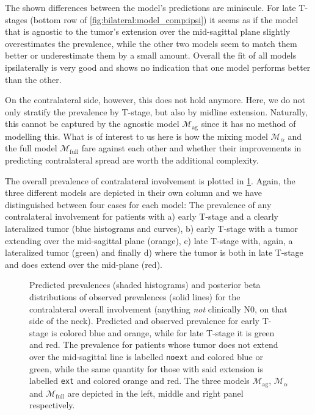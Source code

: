 \documentclass[\relativeRoot/main.tex]{subfiles}
\begin{document}
The shown differences between the model's predictions are miniscule. For late T-stages (bottom row of \cref{fig:bilateral:model_comp:ipsi}) it seems as if the model that is agnostic to the tumor's extension over the mid-sagittal plane slightly overestimates the prevalence, while the other two models seem to match them better or underestimate them by a small amount. Overall the fit of all models ipsilaterally is very good and shows no indication that one model performs better than the other.

On the contralateral side, however, this does not hold anymore. Here, we do not only stratify the prevalence by T-stage, but also by midline extension. Naturally, this cannot be captured by the agnostic model $\mathcal{M}_\text{ag}$ since it has no method of modelling this. What is of interest to us here is how the mixing model $\mathcal{M}_\alpha$ and the full model $\mathcal{M}_\text{full}$ fare against each other and whether their improvements in predicting contralateral spread are worth the additional complexity.

The overall prevalence of contralateral involvement is plotted in \cref{fig:bilateral:model_comp:contra}. Again, the three different models are depicted in their own column and we have distinguished between four cases for each model: The prevalence of any contralateral involvement for patients with a) early T-stage and a clearly lateralized tumor (blue histograms and curves), b) early T-stage with a tumor extending over the mid-sagittal plane (orange), c) late T-stage with, again, a lateralized tumor (green) and finally d) where the tumor is both in late T-stage and does extend over the mid-plane (red).

\begin{figure}
    \def\svgwidth{1.0\textwidth}
    
    \caption{
        Predicted prevalences (shaded histograms) and posterior beta distributions of observed prevalences (solid lines) for the contralateral overall involvement (anything \emph{not} clinically N0, on that side of the neck). Predicted and observed prevalence for early T-stage is colored blue and orange, while for late T-stage it is green and red. The prevalence for patients whose tumor does not extend over the mid-sagittal line is labelled \texttt{noext} and colored blue or green, while the same quantity for those with said extension is labelled \texttt{ext} and colored orange and red. The three models $\mathcal{M}_\text{ag}$, $\mathcal{M}_\alpha$ and $\mathcal{M}_\text{full}$ are depicted in the left, middle and right panel respectively.
    }
    \label{fig:bilateral:model_comp:contra}
\end{figure}
\end{document}
